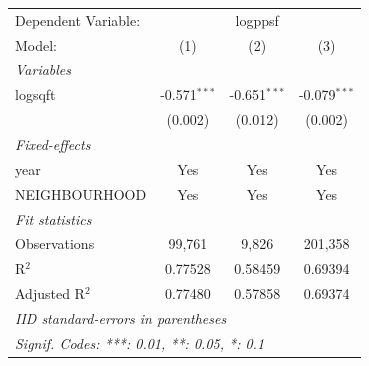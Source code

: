 
\begingroup
\centering
\begin{tabular}{lccc}
   \tabularnewline \midrule \midrule
   Dependent Variable: & \multicolumn{3}{c}{logppsf}\\
   Model:         & (1)            & (2)            & (3)\\  
   \midrule
   \emph{Variables}\\
   logsqft        & -0.571$^{***}$ & -0.651$^{***}$ & -0.079$^{***}$\\   
                  & (0.002)        & (0.012)        & (0.002)\\   
   \midrule
   \emph{Fixed-effects}\\
   year           & Yes            & Yes            & Yes\\  
   NEIGHBOURHOOD  & Yes            & Yes            & Yes\\  
   \midrule
   \emph{Fit statistics}\\
   Observations   & 99,761         & 9,826          & 201,358\\  
   R$^2$          & 0.77528        & 0.58459        & 0.69394\\  
   Adjusted R$^2$ & 0.77480        & 0.57858        & 0.69374\\  
   \midrule \midrule
   \multicolumn{4}{l}{\emph{IID standard-errors in parentheses}}\\
   \multicolumn{4}{l}{\emph{Signif. Codes: ***: 0.01, **: 0.05, *: 0.1}}\\
\end{tabular}
\par\endgroup


